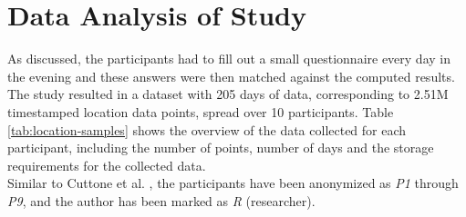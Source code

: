 \section{Data Analysis of Study}
As discussed, the participants had to fill out a small questionnaire every day in the evening and these answers were then matched against the computed results. The study resulted in a dataset with 205 days of data, corresponding to 2.51M timestamped location data points, spread over 10 participants. Table \ref{tab:location-samples} shows the overview of the data collected for each participant, including the number of points, number of days and the storage requirements for the collected data.\\

Similar to Cuttone et al. \cite{sparse-location-2014}, the participants have been anonymized as \textit{P1} through \textit{P9}, and the author has been marked as \textit{R} (researcher).\\

